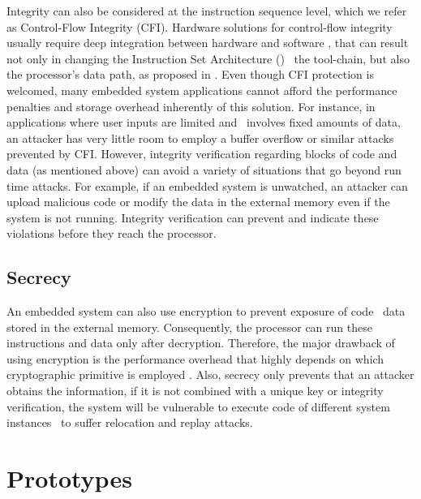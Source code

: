 Integrity can also be considered at the instruction sequence level, which we refer as Control-Flow Integrity (CFI). Hardware solutions for control-flow integrity usually require deep integration between hardware and software \cite{Davi2015:HAFIX}, that can result not only in changing the Instruction Set Architecture (\isa) \andor~the tool-chain, but also the processor's data path, as proposed in \cite{Gelbart2005:CODESSEAL, Kanuparthi2012:DynamicIntegrity}. Even though CFI protection is welcomed, many embedded system applications cannot afford the performance penalties and storage overhead inherently of this solution. For instance, in applications where user inputs are limited and \io~involves fixed amounts of data, an attacker has very little room to employ a buffer overflow or similar attacks prevented by CFI. However, integrity verification regarding blocks of code and data (as mentioned above) can avoid a variety of situations that go beyond run time attacks. For example, if an embedded system is unwatched, an attacker can upload malicious code or modify the data in the external memory even if the system is not running. Integrity verification can prevent and indicate these violations before they reach the processor.


\subsection{Secrecy}
\label{subsec:Secrecy}

An embedded system can also use encryption to prevent exposure of code \andor~data stored in the external memory. Consequently, the processor can run these instructions and data only after decryption. Therefore, the major drawback of using encryption is the performance overhead that highly depends on which cryptographic primitive is employed \cite{Suh2007:PUFs}. Also, secrecy only prevents that an attacker obtains the information, if it is not combined with a unique key or integrity verification, the system will be vulnerable to execute code of different system instances \andor~to suffer  relocation and replay attacks\cite{Elbaz2009}.


\section{Prototypes}
\label{sec:prototypes}


